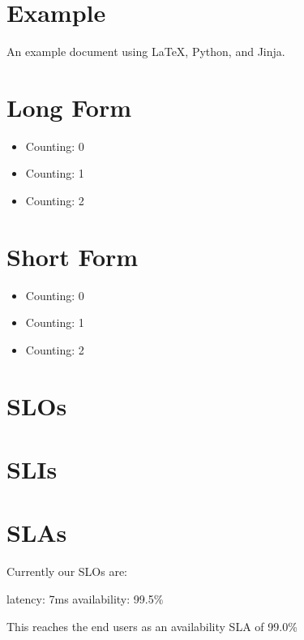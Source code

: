 \documentclass{article}
\begin{document}
\section{Example}
An example document using \LaTeX, Python, and Jinja.

\section{Long Form}
\begin{itemize}
  \item Counting: 0
  \item Counting: 1
  \item Counting: 2
\end{itemize}

\section{Short Form}

\begin{itemize}
  \item Counting: 0
  \item Counting: 1
  \item Counting: 2
\end{itemize}

\section{SLOs}
\section{SLIs}
\section{SLAs}

Currently our SLOs are:

latency: 7ms
availability: 99.5\%

This reaches the end users as an availability SLA of 99.0\%
\end{document}

